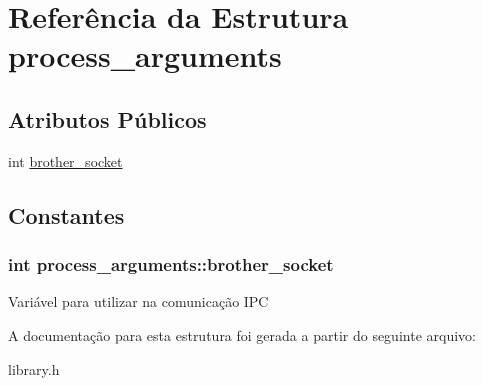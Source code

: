 \hypertarget{structprocess__arguments}{
\section{Referência da Estrutura process\_\-arguments}
\label{structprocess__arguments}
}
\subsection*{Atributos Públicos}
\begin{DoxyCompactItemize}
\item 
int \hyperlink{structprocess__arguments_a498d3d73019750a6922cf47d28f482d6}{brother\_\-socket}
\end{DoxyCompactItemize}


\subsection{Constantes}
\hypertarget{structprocess__arguments_a498d3d73019750a6922cf47d28f482d6}{
\subsubsection[{brother\_\-socket}]{\setlength{\rightskip}{0pt plus 5cm}int {\bf process\_\-arguments::brother\_\-socket}}}
\label{structprocess__arguments_a498d3d73019750a6922cf47d28f482d6}
Variável para utilizar na comunicação IPC 

A documentação para esta estrutura foi gerada a partir do seguinte arquivo:\begin{DoxyCompactItemize}
\item 
library.h\end{DoxyCompactItemize}
